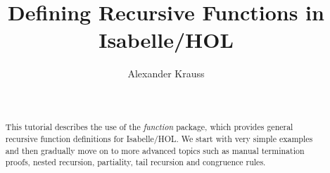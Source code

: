 \documentclass[a4paper,fleqn]{article}
\title{Defining Recursive Functions in Isabelle/HOL}
\author{Alexander Krauss}
\begin{document}
\date{\ \\}
\maketitle

\begin{abstract}
  This tutorial describes the use of the \emph{function} package,
	which provides general recursive function definitions for Isabelle/HOL.
	We start with very simple examples and then gradually move on to more
	advanced topics such as manual termination proofs, nested recursion,
	partiality, tail recursion and congruence rules.
\end{abstract}





%

\begingroup
 \small\raggedright\frenchspacing

\endgroup
\end{document}
